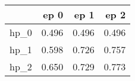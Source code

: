 \begin{tabular}{lrrr}
\toprule
{} &   ep 0 &   ep 1 &   ep 2 \\
\midrule
hp\_0 &  0.496 &  0.496 &  0.496 \\
hp\_1 &  0.598 &  0.726 &  0.757 \\
hp\_2 &  0.650 &  0.729 &  0.773 \\
\bottomrule
\end{tabular}
